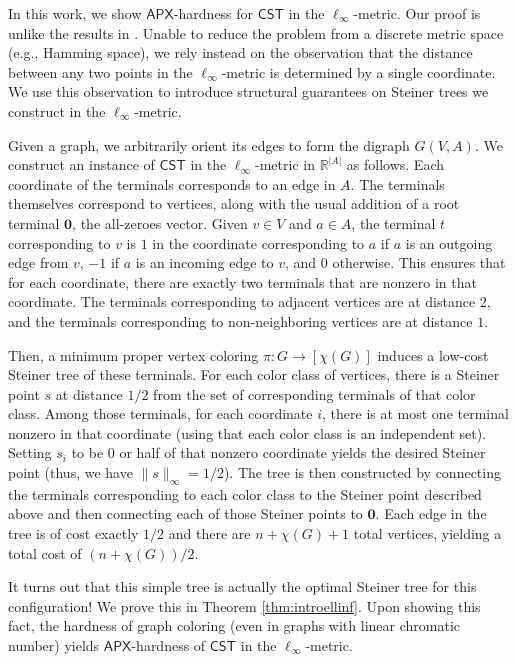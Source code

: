 \documentclass{theoretics}
\newcommand{\R}{\mathbb{R}}
\newcommand{\1}{\textbf{1}}
\newcommand{\cst}{$\mathsf{CST}$\xspace}
\newcommand{\apx}{$\mathsf{APX}$\xspace}
\begin{document}
In this work, we show \apx-hardness for \cst in the $\ell_{\infty}$-metric. Our proof is unlike the results in \cite{Wareham_1995, Trevisan00}. Unable to reduce the problem from a discrete metric space (e.g., Hamming space), we rely instead on the observation that the distance between any two points in the $\ell_{\infty}$-metric is determined by a single coordinate. We use this observation to introduce structural guarantees on Steiner trees we construct in the $\ell_{\infty}$-metric.

Given a graph, we arbitrarily orient its edges to form the digraph $G(V, A)$. We construct an instance of \cst in the $\ell_{\infty}$-metric in $\R^{|A|}$ as follows. Each coordinate of the terminals corresponds to an edge in $A$. The terminals themselves correspond to vertices, along with the usual addition of a root terminal $\mathbf{0}$, the all-zeroes vector. Given $v \in V$ and $a \in A$, the terminal $t$ corresponding to $v$ is $1$ in the coordinate corresponding to $a$ if $a$ is an outgoing edge from $v$, $-1$ if $a$ is an incoming edge to $v$, and $0$ otherwise. This ensures that for each coordinate, there are exactly two terminals that are nonzero in that coordinate. The terminals corresponding to adjacent vertices are at distance $2$, and the terminals corresponding to non-neighboring vertices are at distance $1$.

Then, a minimum proper vertex coloring $\pi: G \to [\chi(G)]$ induces a low-cost Steiner tree of these terminals. For each color class of vertices, there is a Steiner point $s$ at distance $1/2$ from the set of corresponding terminals of that color class. Among those terminals, for each coordinate $i$, there is at most one terminal nonzero in that coordinate (using that each color class is an independent set). Setting $s_i$ to be $0$ or half of that nonzero coordinate yields the desired Steiner point (thus, we have $\|s\|_\infty=1/2$). The tree  is then constructed by connecting the terminals corresponding to each color class to the  Steiner point described above and then connecting each of those Steiner points to $\mathbf{0}$. Each edge in the tree is of cost exactly $1/2$ and there are $n + \chi(G) + 1$ total vertices, yielding a total cost of $(n + \chi(G))/2$. 

It turns out that this simple tree is actually the optimal Steiner tree for this configuration! We prove this in Theorem \ref{thm:introellinf}. Upon showing this fact, the hardness of graph coloring (even in graphs with linear chromatic number) yields \apx-hardness of \cst in the $\ell_{\infty}$-metric. 
\end{document}
